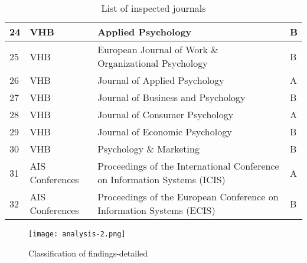 \begin{table}[h!]
\begin{tabular}{|l|l|p{8.5cm}|l|}
24 & VHB & Applied Psychology & B \\ \hline
25 & VHB & European Journal of Work \& Organizational Psychology & B \\ \hline
26 & VHB & Journal of Applied Psychology & A \\ \hline
27 & VHB & Journal of Business and Psychology & B \\ \hline
28 & VHB & Journal of Consumer Psychology & A \\ \hline
29 & VHB & Journal of Economic Psychology & B \\ \hline
30 & VHB & Psychology \& Marketing & B \\ \hline
31 & AIS Conferences & Proceedings of the International Conference on Information Systems (ICIS) & A \\ \hline
32 & AIS Conferences & Proceedings of the European Conference on Information Systems (ECIS) & B \\ \hline
\end{tabular}
\caption{List of inspected journals}
\label{table:journals}
\end{table}

\newpage

\begin{figure}[h!]
    \centering
    \texttt{[image: analysis-2.png]}
    \caption{Classification of findings-detailed}
    \label{fig:analysis-detail}
\end{figure}

\newpage

